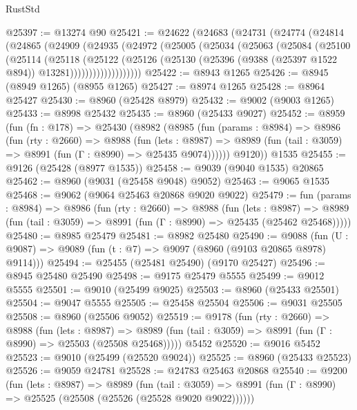 \begin{lexlean}{RustStd}
\begin{coremodule}
@25397 := @13274 @90
@25421 := @24622
    (@24683
      (@24731
        (@24774
          (@24814
            (@24865
              (@24909
                (@24935
                  (@24972
                    (@25005
                      (@25034
                        (@25063
                          (@25084
                            (@25100
                              (@25114
                                (@25118
                                  (@25122
                                    (@25126
                                      (@25130
                                        (@25396
                                          (@9388 (@25397 @1522 @894))
                                          @13281)))))))))))))))))))
@25422 := @8943 @1265
@25426 := @8945 (@8949 @1265) (@8955 @1265)
@25427 := @8974 @1265
@25428 := @8964 @25427
@25430 := @8960 (@25428 @8979)
@25432 := @9002 (@9003 @1265)
@25433 := @8998 @25432
@25435 := @8960 (@25433 @9027)
@25452 := @8959
    (fun (fn : @178) =>
    @25430
      (@8982
        (@8985
          (fun (params : @8984) =>
          @8986
            (fun (rty : @2660) =>
            @8988
              (fun (lets : @8987) =>
              @8989 (fun (tail : @3059) => @8991 (fun (Γ : @8990) => @25435 @9074))))))
        @9120))
    @1535
@25455 := @9126 (@25428 (@8977 @1535))
@25458 := @9039 (@9040 @1535) @20865
@25462 := @8960 (@9031 (@25458 @9048) @9052)
@25463 := @9065 @1535
@25468 := @9062 (@9064 @25463 @20868 @9020 @9022)
@25479 := fun (params : @8984) =>
  @8986
    (fun (rty : @2660) =>
    @8988
      (fun (lets : @8987) =>
      @8989 (fun (tail : @3059) => @8991 (fun (Γ : @8990) => @25435 (@25462 @25468)))))
@25480 := @8985 @25479
@25481 := @8982 @25480
@25490 := @9088
    (fun (U : @9087) => @9089 (fun (t : @7) => @9097 (@8960 (@9103 @20865 @8978) @9114)))
@25494 := @25455 (@25481 @25490) (@9170 @25427)
@25496 := @8945 @25480 @25490
@25498 := @9175 @25479 @5555
@25499 := @9012 @5555
@25501 := @9010 (@25499 @9025)
@25503 := @8960 (@25433 @25501)
@25504 := @9047 @5555
@25505 := @25458 @25504
@25506 := @9031 @25505
@25508 := @8960 (@25506 @9052)
@25519 := @9178
    (fun (rty : @2660) =>
    @8988
      (fun (lets : @8987) =>
      @8989 (fun (tail : @3059) => @8991 (fun (Γ : @8990) => @25503 (@25508 @25468)))))
    @5452
@25520 := @9016 @5452
@25523 := @9010 (@25499 (@25520 @9024))
@25525 := @8960 (@25433 @25523)
@25526 := @9059 @24781
@25528 := @24783 @25463 @20868
@25540 := @9200
    (fun (lets : @8987) =>
    @8989
      (fun (tail : @3059) =>
      @8991 (fun (Γ : @8990) => @25525 (@25508 (@25526 (@25528 @9020 @9022))))))

\end{coremodule}
\end{lexlean}
